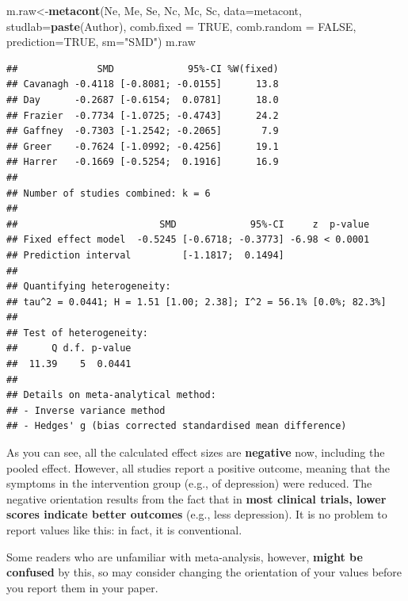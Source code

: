 \documentclass[]{book}
\newenvironment{Shaded}{\begin{snugshade}}{\end{snugshade}}
\newcommand{\DataTypeTok}[1]{\textcolor[rgb]{0.13,0.29,0.53}{#1}}
\newcommand{\KeywordTok}[1]{\textcolor[rgb]{0.13,0.29,0.53}{\textbf{#1}}}
\newcommand{\NormalTok}[1]{#1}
\newcommand{\OtherTok}[1]{\textcolor[rgb]{0.56,0.35,0.01}{#1}}
\newcommand{\StringTok}[1]{\textcolor[rgb]{0.31,0.60,0.02}{#1}}
\begin{document}
\begin{Shaded}
\begin{Highlighting}[]
\NormalTok{m.raw<-}\KeywordTok{metacont}\NormalTok{(Ne,}
\NormalTok{                Me,}
\NormalTok{                Se,}
\NormalTok{                Nc,}
\NormalTok{                Mc,}
\NormalTok{                Sc,}
                \DataTypeTok{data=}\NormalTok{metacont,}
                \DataTypeTok{studlab=}\KeywordTok{paste}\NormalTok{(Author),}
                \DataTypeTok{comb.fixed =} \OtherTok{TRUE}\NormalTok{,}
                \DataTypeTok{comb.random =} \OtherTok{FALSE}\NormalTok{,}
                \DataTypeTok{prediction=}\OtherTok{TRUE}\NormalTok{,}
                \DataTypeTok{sm=}\StringTok{"SMD"}\NormalTok{)}
\NormalTok{m.raw}
\end{Highlighting}
\end{Shaded}

\begin{verbatim}
##              SMD             95%-CI %W(fixed)
## Cavanagh -0.4118 [-0.8081; -0.0155]      13.8
## Day      -0.2687 [-0.6154;  0.0781]      18.0
## Frazier  -0.7734 [-1.0725; -0.4743]      24.2
## Gaffney  -0.7303 [-1.2542; -0.2065]       7.9
## Greer    -0.7624 [-1.0992; -0.4256]      19.1
## Harrer   -0.1669 [-0.5254;  0.1916]      16.9
## 
## Number of studies combined: k = 6
## 
##                         SMD             95%-CI     z  p-value
## Fixed effect model  -0.5245 [-0.6718; -0.3773] -6.98 < 0.0001
## Prediction interval         [-1.1817;  0.1494]               
## 
## Quantifying heterogeneity:
## tau^2 = 0.0441; H = 1.51 [1.00; 2.38]; I^2 = 56.1% [0.0%; 82.3%]
## 
## Test of heterogeneity:
##      Q d.f. p-value
##  11.39    5  0.0441
## 
## Details on meta-analytical method:
## - Inverse variance method
## - Hedges' g (bias corrected standardised mean difference)
\end{verbatim}

\begin{rmdachtung}
As you can see, all the calculated effect sizes are \textbf{negative}
now, including the pooled effect. However, all studies report a positive
outcome, meaning that the symptoms in the intervention group (e.g., of
depression) were reduced. The negative orientation results from the fact
that in \textbf{most clinical trials, lower scores indicate better
outcomes} (e.g., less depression). It is no problem to report values
like this: in fact, it is conventional.

Some readers who are unfamiliar with meta-analysis, however,
\textbf{might be confused} by this, so may consider changing the
orientation of your values before you report them in your paper.
\end{rmdachtung}
\end{document}
